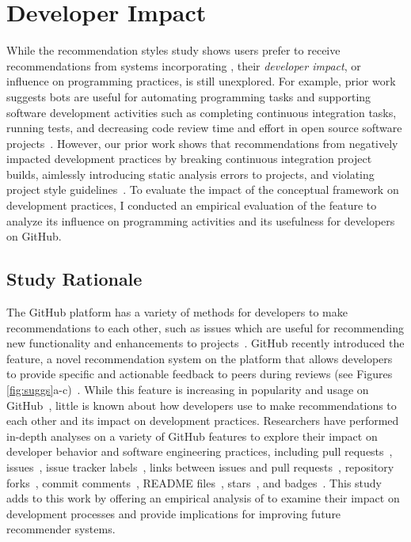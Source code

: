 \section{Developer Impact}

While the recommendation styles study shows users prefer to receive recommendations from systems incorporating \framework, their \textit{developer impact}, or influence on programming practices, is still unexplored. For example, prior work suggests bots are useful for automating programming tasks and supporting software development activities such as completing continuous integration tasks, running tests, and decreasing code review time and effort in open source software projects~\cite{wessel2018power}. However, our prior work shows that \tele recommendations from \toolone negatively impacted development practices by breaking continuous integration project builds, aimlessly introducing static analysis errors to projects, and violating project style guidelines~\cite{Sorry}. To evaluate the impact of the conceptual framework on development practices, I conducted an empirical evaluation of the \sugg feature to analyze its influence on programming activities and its usefulness for developers on GitHub. 


\subsection{Study Rationale}

The GitHub platform has a variety of methods for developers to make recommendations to each other, such as issues which are useful for recommending new functionality and enhancements to projects~\cite{bissyande2013issues}. GitHub recently introduced the \sugg feature, a novel recommendation system on the platform that allows developers to provide specific and actionable feedback to peers during reviews (see Figures \ref{fig:suggs}a-c)~\cite{SuggestedChanges}. While this feature is increasing in popularity and usage on GitHub~\cite{SuggestedChanges2}, little is known about how developers use \sugg to make recommendations to each other and its impact on development practices. Researchers have performed in-depth analyses on a variety of GitHub features to explore their impact on developer behavior and software engineering practices, including pull requests~\cite{gousios2015work}, issues~\cite{bissyande2013issues}, issue tracker labels~\cite{cabot2015exploring}, links between issues and pull requests~\cite{li2018issue}, repository forks~\cite{jiang2017and}, commit comments~\cite{guzman2014sentiment}, README files~\cite{prana2019categorizing}, stars~\cite{borges2018stars}, and badges~\cite{trockman2018badges}. This study adds to this work by offering an empirical analysis of \suggs to examine their impact on development processes and provide implications for improving future recommender systems.

